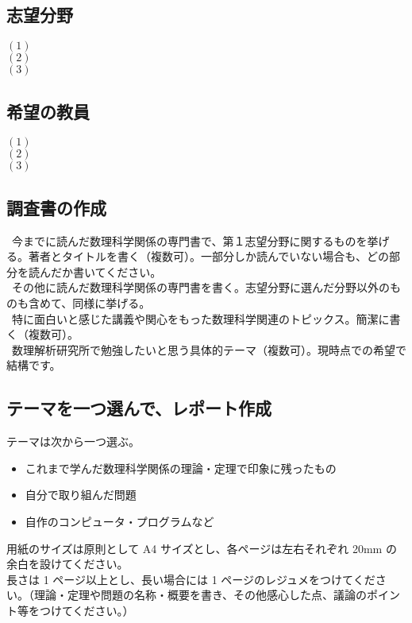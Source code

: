 \documentclass{jsarticle}
\begin{document}
\subsection{志望分野}
$(1)$\\
$(2)$\\
$(3)$

\subsection{希望の教員}
$(1)$\\
$(2)$\\
$(3)$

\subsection{調査書の作成}
\ 今までに読んだ数理科学関係の専門書で、第１志望分野に関するものを挙げる。著者とタイトルを書く（複数可）。一部分しか読んでいない場合も、どの部分を読んだか書いてください。\\ \newline
{}\ その他に読んだ数理科学関係の専門書を書く。志望分野に選んだ分野以外のものも含めて、同様に挙げる。\\ \newline
{}\ 特に面白いと感じた講義や関心をもった数理科学関連のトピックス。簡潔に書く（複数可）。\\ \newline
{}\ 数理解析研究所で勉強したいと思う具体的テーマ（複数可）。現時点での希望で結構です。\newline

\subsection{テーマを一つ選んで、レポート作成}
テーマは次から一つ選ぶ。
\begin{itemize}
\item これまで学んだ数理科学関係の理論・定理で印象に残ったもの
\item 自分で取り組んだ問題
\item 自作のコンピュータ・プログラムなど
\end{itemize}
用紙のサイズは原則として A4 サイズとし、各ページは左右それぞれ 20mm の余白を設けてください。\\
長さは 1 ページ以上とし、長い場合には 1 ページのレジュメをつけてください。（理論・定理や問題の名称・概要を書き、その他感心した点、議論のポイント等をつけてください。）
\end{document}
